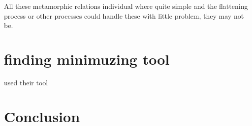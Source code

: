 All these metamorphic relations individual where quite simple and the flattening process or other processes could handle these with little problem, they may not be. 

\section{finding minimuzing tool}
used their tool 


\section{Conclusion}
\label{impl:conclusion}

